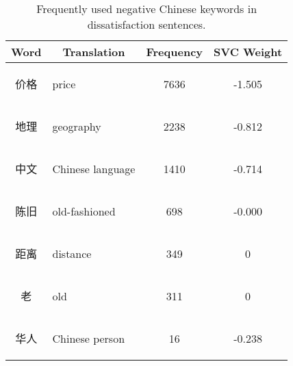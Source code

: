 
\begin{table}[hbp] \centering
\caption{Frequently used negative Chinese keywords in dissatisfaction sentences.}
\label{tab:neg_keys_zh}
\begin{tabular}{|c|l|c|c|} \hline
\textbf{Word} & \multicolumn{1}{c|}{\textbf{Translation}} & \textbf{Frequency} & \textbf{SVC Weight} \\ \hline
\begin{CJK}{UTF8}{gbsn} 价格 \end{CJK} 
    & price 
        & 7636 & -1.505 \\ \hline
\begin{CJK}{UTF8}{gbsn} 地理 \end{CJK} 
    & geography 
        & 2238 & -0.812 \\ \hline
\begin{CJK}{UTF8}{gbsn} 中文 \end{CJK} 
    & Chinese language 
        & 1410 & -0.714 \\ \hline
\begin{CJK}{UTF8}{gbsn} 陈旧 \end{CJK} 
    & old-fashioned 
        & 698 & -0.000 \\ \hline
\begin{CJK}{UTF8}{gbsn} 距离 \end{CJK} 
    & distance 
        & 349 & 0 \\ \hline
\begin{CJK}{UTF8}{gbsn} 老 \end{CJK} 
    & old 
        & 311 & 0 \\ \hline
\begin{CJK}{UTF8}{gbsn} 华人 \end{CJK} 
    & Chinese person 
        & 16 & -0.238 \\ \hline
\end{tabular}
\end{table}




